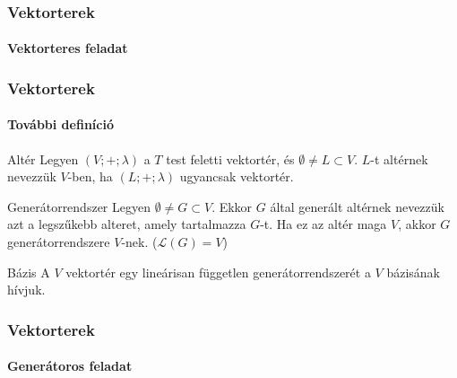 \documentclass[xcolor={table}]{beamer}
\begin{document}
\begin{frame}
  \frametitle{Vektorterek}
  \framesubtitle{Vektorteres feladat}

  
\end{frame}

\begin{frame}
  \frametitle{Vektorterek}
  \framesubtitle{További definíció}

  \begin{block}{Altér}
    Legyen $(V; +; \lambda)$ a $T$ test feletti vektortér, és
    $\emptyset \neq L \subset V$. $L$-t altérnek nevezzük $V$-ben, ha
    $(L; +; \lambda)$ ugyancsak vektortér.
  \end{block}

  \begin{block}{Generátorrendszer}
    Legyen $\emptyset \neq G \subset V$. Ekkor $G$ által generált altérnek
    nevezzük azt a legszűkebb alteret, amely tartalmazza $G$-t. Ha ez az
    altér maga $V$, akkor $G$ generátorrendszere $V$-nek. ($\mathcal L(G)=V$)
  \end{block}

  \begin{block}{Bázis}
    A $V$ vektortér egy lineárisan független generátorrendszerét a $V$ bázisának
    hívjuk.
  \end{block}
\end{frame}

\begin{frame}
  \frametitle{Vektorterek}
  \framesubtitle{Generátoros feladat}

  \vspace{-7.5mm}
  
\end{frame}
\end{document}
